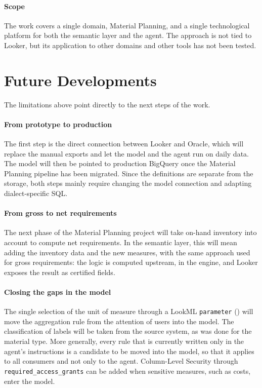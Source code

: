 \paragraph{Scope}
The work covers a single domain, Material Planning, and a single technological platform for both the semantic layer and the agent. The approach is not tied to Looker, but its application to other domains and other tools has not been tested.

\section{Future Developments}
\label{sec:conclusions_future}

The limitations above point directly to the next steps of the work.

\paragraph{From prototype to production}
The first step is the direct connection between Looker and Oracle, which will replace the manual exports and let the model and the agent run on daily data. The model will then be pointed to production BigQuery once the Material Planning pipeline has been migrated. Since the definitions are separate from the storage, both steps mainly require changing the model connection and adapting dialect-specific SQL.

\paragraph{From gross to net requirements}
The next phase of the Material Planning project will take on-hand inventory into account to compute net requirements. In the semantic layer, this will mean adding the inventory data and the new measures, with the same approach used for gross requirements: the logic is computed upstream, in the engine, and Looker exposes the result as certified fields.

\paragraph{Closing the gaps in the model}
The single selection of the unit of measure through a LookML \texttt{parameter} () will move the aggregation rule from the attention of users into the model. The classification of labels will be taken from the source system, as was done for the material type. More generally, every rule that is currently written only in the agent's instructions is a candidate to be moved into the model, so that it applies to all consumers and not only to the agent. Column-Level Security through \texttt{required\_access\_grants} can be added when sensitive measures, such as costs, enter the model.

